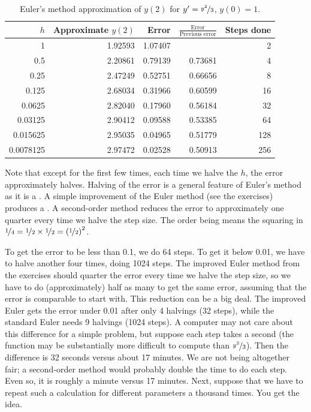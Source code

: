 \begin{table}[h!t]
\mybeginframe
\capstart
\begin{center}
\begin{tabular}{@{}rrrrr@{}}
\toprule
$h$ & Approximate $y(2)$ & Error & $\frac{\text{Error}}{\text{Previous
error}}$ & Steps done \\
\midrule
1        & 1.92593 & 1.07407 &         & 2 \\
0.5      & 2.20861 & 0.79139 & 0.73681 & 4 \\
0.25     & 2.47249 & 0.52751 & 0.66656 & 8 \\
0.125    & 2.68034 & 0.31966 & 0.60599 & 16 \\
0.0625   & 2.82040 & 0.17960 & 0.56184 & 32 \\
0.03125  & 2.90412 & 0.09588 & 0.53385 & 64 \\
0.015625 & 2.95035 & 0.04965 & 0.51779 & 128 \\
0.0078125& 2.97472 & 0.02528 & 0.50913 & 256 \\
\bottomrule
\end{tabular}
\end{center}
\caption{Euler's method approximation of $y(2)$ for
$y'=\nicefrac{y^2}{3}$, $y(0)=1$.\label{euler-table:table}}
\myendframe
\end{table}

Note that except for the first few times, each time we halve
the $h$, the error approximately halves.
Halving of the error is a general feature of Euler's method as it is a
\emph{}.
A simple improvement of the Euler method (see the exercises)
produces a .
A second-order method
reduces the error to approximately one
quarter every time we halve the step size.  The order being
 means the squaring in
$\nicefrac{1}{4} = \nicefrac{1}{2} \times \nicefrac{1}{2}
= {(\nicefrac{1}{2})}^2$.

To get the error to be less than 0.1, we do
64 steps.  To get it below 0.01, we have to halve another
four times, doing 1024 steps.
The improved Euler method from the exercises
should quarter the
error every time we halve the step size,
so we have to do (approximately) half as many
 to get the same error,
assuming that the error is comparable to start with.
This reduction can be a big deal.
The improved Euler gets the error under 0.01 after only 4 halvings (32
steps), while the standard Euler needs 9 halvings (1024 steps).
A computer may not care about this
difference for a simple problem, but suppose each step takes a
second (the function may be substantially more difficult to compute
than $\nicefrac{y^2}{3}$).  Then the difference is 32 seconds 
versus about 17 minutes.
We are not being altogether fair; a second-order method would probably
double the time to do each step.  Even so, it is roughly a minute versus 17 minutes.
Next, suppose that we have to repeat such a calculation for different
parameters a thousand times.  You get the idea.

